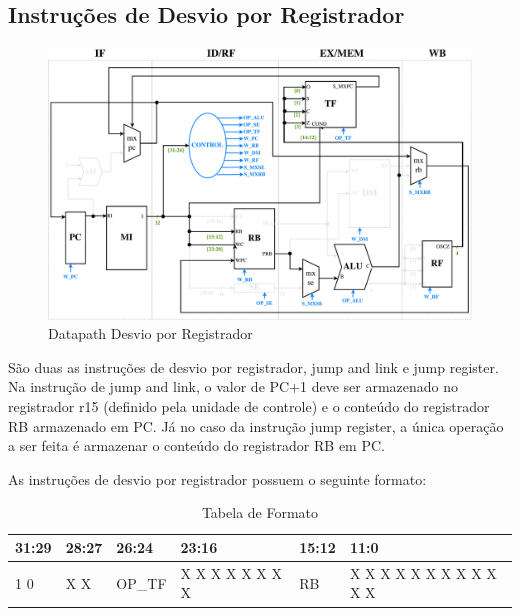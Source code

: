 \documentclass{report}
\begin{document}
\newpage
\subsection{Instruções de Desvio por Registrador}
\begin{figure}[H]
\centering
\includegraphics[width=\textwidth]{./pictures/DatapathDER.pdf}
\caption{Datapath Desvio por Registrador}
\end{figure}
São duas as instruções de desvio por registrador, jump and link e jump register. Na instrução de jump and link, o valor de PC+1 deve ser armazenado no registrador r15 (definido pela unidade de controle) e o conteúdo do registrador RB armazenado em PC. Já no caso da instrução jump register, a única operação a ser feita é armazenar o conteúdo do registrador RB em PC.\newline

As instruções de desvio por registrador possuem o seguinte formato:

\FloatBarrier
\begin{table}[H]
  \begin{center}
  \renewcommand{\arraystretch}{1.46}
    \begin{tabular}[pos]{|>{\centering\arraybackslash}m{31pt}|>{\centering\arraybackslash}m{32pt}|>{\centering\arraybackslash}m{29pt}|>{\centering\arraybackslash}m{90pt}|>{\centering\arraybackslash}m{32pt}|>{\centering\arraybackslash}m{127pt}|} \hline
      \cellcolor[gray]{0.9}\textbf{31:29} & \cellcolor[gray]{0.9}\textbf{28:27} & \cellcolor[gray]{0.9}\textbf{26:24} & \cellcolor[gray]{0.9}\textbf{23:16} & \cellcolor[gray]{0.9}\textbf{15:12} & \cellcolor[gray]{0.9}\textbf{11:0} \\ \hline
        1 1 0       & X X       & OP\_TF       & X X X X X X X X       & RB        & X X X X X X X X X X X X \\ \hline
    \end{tabular}
    \caption{Tabela de Formato}
  \end{center}
\end{table}  
\end{document}
